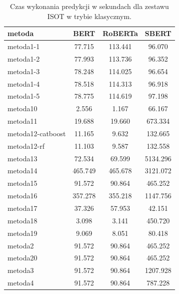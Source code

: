 \begin{table}[H]
	\centering
	\caption{Czas wykonania predykcji w sekundach dla zestawu ISOT w trybie klasycznym.}
	\label{tab:execution_time_classic_isot}
	\small
	\begin{tabular}{lccc}
		\toprule
		\textbf{metoda}   & \textbf{BERT} & \textbf{RoBERTa} & \textbf{SBERT} \\
		\midrule
		metoda1-1         & 77.715        & 113.441          & 96.070         \\
		metoda1-2         & 77.993        & 113.736          & 96.352         \\
		metoda1-3         & 78.248        & 114.025          & 96.654         \\
		metoda1-4         & 78.518        & 114.313          & 96.918         \\
		metoda1-5         & 78.775        & 114.619          & 97.198         \\
		metoda10          & 2.556         & 1.167            & 66.167         \\
		metoda11          & 19.688        & 19.660           & 673.334        \\
		metoda12-catboost & 11.165        & 9.632            & 132.665        \\
		metoda12-rf       & 11.103        & 9.587            & 132.558        \\
		metoda13          & 72.534        & 69.599           & 5134.296       \\
		metoda14          & 465.749       & 465.678          & 3121.072       \\
		metoda15          & 91.572        & 90.864           & 465.252        \\
		metoda16          & 357.278       & 355.218          & 1147.756       \\
		metoda17          & 37.326        & 57.953           & 42.151         \\
		metoda18          & 3.098         & 3.141            & 450.720        \\
		metoda19          & 9.069         & 8.051            & 80.418         \\
		metoda2           & 91.572        & 90.864           & 465.252        \\
		metoda20          & 91.572        & 90.864           & 465.252        \\
		metoda3           & 91.572        & 90.864           & 1207.928       \\
		metoda4           & 91.572        & 90.864           & 787.228        \\

\end{tabular}
\end{table}
